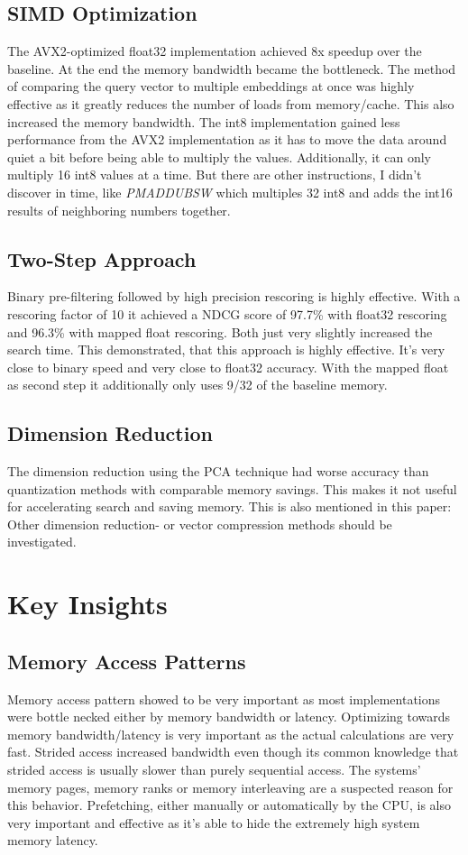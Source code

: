 \subsection{SIMD Optimization}
The AVX2-optimized float32 implementation achieved 8x speedup over the baseline. At the end the memory bandwidth became the bottleneck. The method of comparing the query vector to multiple embeddings at once was highly effective as it greatly reduces the number of loads from memory/cache. This also increased the memory bandwidth.
The int8 implementation gained less performance from the AVX2 implementation as it has to move the data around quiet a bit before being able to multiply the values. Additionally, it can only multiply 16 int8 values at a time. But there are other instructions, I didn't discover in time, like \textit{PMADDUBSW} which multiples 32 int8 and adds the int16 results of neighboring numbers together.

\subsection{Two-Step Approach}
Binary pre-filtering followed by high precision rescoring is highly effective. With a rescoring factor of 10 it achieved a NDCG score of 97.7\% with float32 rescoring and 96.3\% with mapped float rescoring. Both just very slightly increased the search time.
This demonstrated, that this approach is highly effective. It's very close to binary speed and very close to float32 accuracy. With the mapped float as second step it additionally only uses 9/32 of the baseline memory.

\subsection{Dimension Reduction}
The dimension reduction using the PCA technique had worse accuracy than quantization methods with comparable memory savings. This makes it not useful for accelerating search and saving memory. This is also mentioned in this paper:~\cite{thakur2023injectingdomainadaptationlearningtohash} Other dimension reduction- or vector compression methods should be investigated.

\section{Key Insights}
\subsection{Memory Access Patterns}
Memory access pattern showed to be very important as most implementations were bottle necked either by memory bandwidth or latency. Optimizing towards memory bandwidth/latency is very important as the actual calculations are very fast.
Strided access increased bandwidth even though its common knowledge that strided access is usually slower than purely sequential access. The systems' memory pages, memory ranks or memory interleaving are a suspected reason for this behavior.
Prefetching, either manually or automatically by the CPU, is also very important and effective as it's able to hide the extremely high system memory latency.

